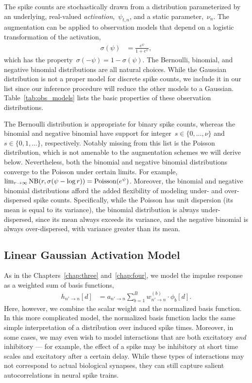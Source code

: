 The spike counts are stochastically drawn from a distribution
parameterized by an underlying, real-valued
\emph{activation},~$\psi_{t,n}$, and a static parameter,~$\nu_n$. 
The \polyagamma augmentation can be applied to observation models 
that depend on a logistic transformation of the activation,
\begin{align*}
  \sigma(\psi) &= \frac{e^\psi}{1+e^\psi},
\end{align*}
which has the property~$\sigma(-\psi) = 1-\sigma(\psi)$. The Bernoulli,
binomial, and negative binomial distributions are all natural choices.
While the Gaussian distribution is not a proper model for discrete
spike counts, we include it in our list since our inference procedure will 
reduce the other models to a Gaussian. Table~\ref{tab:obs_models} 
lists the basic properties of these observation distributions.

The Bernoulli distribution is appropriate for binary spike counts,
whereas the binomial and negative binomial have support for
integer~$s\in \{0, \ldots, \nu\}$ and~$s \in \{0, 1, \ldots \}$,
respectively.  Notably missing from this list is the Poisson
distribution, which is not amenable to the augmentation schemes we
will derive below. Nevertheless, both the binomial and negative
binomial distributions converge to the Poisson under certain
limits. For example, $\lim_{r \to \infty} \mathrm{NB}(r,
\sigma(\psi - \log r)) = \mathrm{Poisson}(e^\psi)$. Moreover, the binomial
and negative binomial distributions afford the added flexibility of
modeling under- and over-dispersed spike counts. Specifically, while
the Poisson has unit dispersion (its mean is equal to its variance),
the binomial distribution is always under-dispersed, since its mean
always exceeds its variance, and the negative binomial is always
over-dispersed, with variance greater than its mean.

\subsection{Linear Gaussian Activation Model}
As in the Chapters~\ref{chap:three} and~\ref{chap:four}, we model the
impulse response as a weighted sum of basis functions,
\begin{align}
\label{eq:glm_impulse}
h_{n' \to n}[d] &= a_{n' \to n} \sum_{b=1}^B w_{n' \to n}^{(b)} \cdot \phi_b[d].
\end{align}
Here, however, we combine the scalar weight and 
the normalized basis function. In this more complicated model, the normalized 
basis function lacks the same simple interpretation of a distribution over 
induced spike times.  Moreover, in some cases, we may even wish to model interactions that 
are both excitatory \emph{and} inhibitory --- for example, the effect of a
spike may be inhibitory at short time scales and excitatory after a certain
delay. While these types of interactions may not correspond to actual biological synapses, they 
can still capture salient autocorrelations in neural spike trains.

